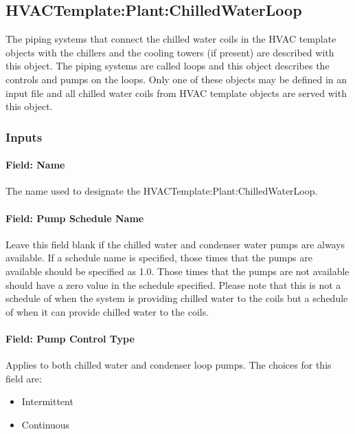 \subsection{HVACTemplate:Plant:ChilledWaterLoop}\label{hvactemplateplantchilledwaterloop}

The piping systems that connect the chilled water coils in the HVAC template objects with the chillers and the cooling towers (if present) are described with this object. The piping systems are called loops and this object describes the controls and pumps on the loops. Only one of these objects may be defined in an input file and all chilled water coils from HVAC template objects are served with this object.

\subsubsection{Inputs}\label{inputs-23-001}

\paragraph{Field: Name}\label{field-name-10-007}

The name used to designate the HVACTemplate:Plant:ChilledWaterLoop.

\paragraph{Field: Pump Schedule Name}\label{field-pump-schedule-name}

Leave this field blank if the chilled water and condenser water pumps are always available. If a schedule name is specified, those times that the pumps are available should be specified as 1.0. Those times that the pumps are not available should have a zero value in the schedule specified. Please note that this is not a schedule of when the system is providing chilled water to the coils but a schedule of when it can provide chilled water to the coils.

\paragraph{Field: Pump Control Type}\label{field-pump-control-type}

Applies to both chilled water and condenser loop pumps. The choices for this field are:

\begin{itemize}
\item
  Intermittent
\item
  Continuous
\end{itemize}

